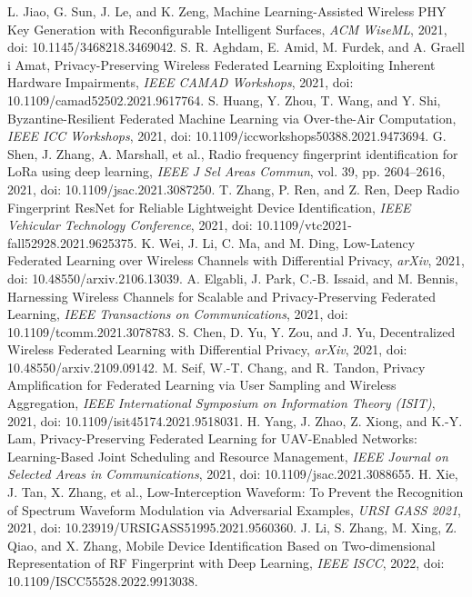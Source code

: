 L. Jiao, G. Sun, J. Le, and K. Zeng, Machine Learning-Assisted Wireless PHY Key Generation with Reconfigurable Intelligent Surfaces, \emph{ACM WiseML}, 2021, doi: 10.1145/3468218.3469042.
S. R. Aghdam, E. Amid, M. Furdek, and A. Graell i Amat, Privacy-Preserving Wireless Federated Learning Exploiting Inherent Hardware Impairments, \emph{IEEE CAMAD Workshops}, 2021, doi: 10.1109/camad52502.2021.9617764.
S. Huang, Y. Zhou, T. Wang, and Y. Shi, Byzantine-Resilient Federated Machine Learning via Over-the-Air Computation, \emph{IEEE ICC Workshops}, 2021, doi: 10.1109/iccworkshops50388.2021.9473694.
G. Shen, J. Zhang, A. Marshall, et al., Radio frequency fingerprint identification for LoRa using deep learning, \emph{IEEE J Sel Areas Commun}, vol. 39, pp. 2604--2616, 2021, doi: 10.1109/jsac.2021.3087250.
T. Zhang, P. Ren, and Z. Ren, Deep Radio Fingerprint ResNet for Reliable Lightweight Device Identification, \emph{IEEE Vehicular Technology Conference}, 2021, doi: 10.1109/vtc2021-fall52928.2021.9625375.
K. Wei, J. Li, C. Ma, and M. Ding, Low-Latency Federated Learning over Wireless Channels with Differential Privacy, \emph{arXiv}, 2021, doi: 10.48550/arxiv.2106.13039.
A. Elgabli, J. Park, C.-B. Issaid, and M. Bennis, Harnessing Wireless Channels for Scalable and Privacy-Preserving Federated Learning, \emph{IEEE Transactions on Communications}, 2021, doi: 10.1109/tcomm.2021.3078783.
S. Chen, D. Yu, Y. Zou, and J. Yu, Decentralized Wireless Federated Learning with Differential Privacy, \emph{arXiv}, 2021, doi: 10.48550/arxiv.2109.09142.
M. Seif, W.-T. Chang, and R. Tandon, Privacy Amplification for Federated Learning via User Sampling and Wireless Aggregation, \emph{IEEE International Symposium on Information Theory (ISIT)}, 2021, doi: 10.1109/isit45174.2021.9518031.
H. Yang, J. Zhao, Z. Xiong, and K.-Y. Lam, Privacy-Preserving Federated Learning for UAV-Enabled Networks: Learning-Based Joint Scheduling and Resource Management, \emph{IEEE Journal on Selected Areas in Communications}, 2021, doi: 10.1109/jsac.2021.3088655.
H. Xie, J. Tan, X. Zhang, et al., Low-Interception Waveform: To Prevent the Recognition of Spectrum Waveform Modulation via Adversarial Examples, \emph{URSI GASS 2021}, 2021, doi: 10.23919/URSIGASS51995.2021.9560360.
J. Li, S. Zhang, M. Xing, Z. Qiao, and X. Zhang, Mobile Device Identification Based on Two-dimensional Representation of RF Fingerprint with Deep Learning, \emph{IEEE ISCC}, 2022, doi: 10.1109/ISCC55528.2022.9913038.
